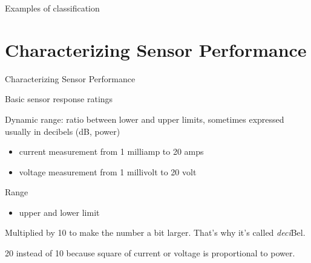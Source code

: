 \documentclass[compress]{beamer}
\providecommand{\tightlist}{%
  \setlength{\itemsep}{0pt}\setlength{\parskip}{0pt}}
\begin{document}
\begin{frame}{Examples of classification}

\end{frame}

\section{Characterizing Sensor
Performance}\label{characterizing-sensor-performance}

\begin{frame}{Characterizing Sensor Performance}

Basic sensor response ratings

Dynamic range: ratio between lower and upper limits, sometimes expressed
usually in decibels (dB, power)

\begin{itemize}
\tightlist
\item
  \eg current measurement from 1 milliamp to 20 amps
\item
  \eg voltage measurement from 1 millivolt to 20 volt
\end{itemize}

Range

\begin{itemize}
\tightlist
\item
  upper and lower limit
\end{itemize}

Multiplied by 10 to make the number a bit larger. That's why it's called
\emph{deci}Bel.

20 instead of 10 because square of current or voltage is proportional to
power.

\end{frame}
\end{document}
